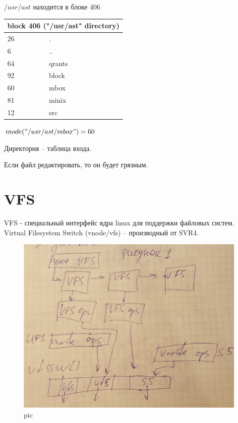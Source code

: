 $/usr/ast$ находится в блоке 406

\begin{table}[H]
\begin{tabular}{|l|l|}
\hline
\multicolumn{2}{|c|}{block 406 ("/usr/ast" directory)} \\
\hline
26 & . \\
6 & .. \\
64 & qrants \\
92 & block \\
60 & mbox \\
81 & minix \\
12 & src \\
\hline
\end{tabular}
\end{table}

$inode("/usr/ast/mbox") = 60$

Директория – таблица входа.

 

Если файл редактировать, то он будет грязным.

\section{VFS}

VFS - специальный интерфейс ядра linux для поддержки файловых систем.
Virtual Filesystem Switch (vnode/vfs) – производный от SVR4.

\begin{figure}[H]
  \centering
  \includegraphics[width=\textwidth]{pic/1.png}
  \caption{pic}
\end{figure}

